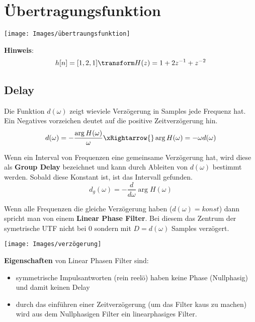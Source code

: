 \section{Übertragungsfunktion}
\begin{center}
	\texttt{[image: Images/übertraungsfunktion]}
\end{center}

\textbf{Hinweis}:
\[
h[n] = [1, 2, 1] \transform H(z) = 1 + 2z^{-1} + z^{-2}
\]

\subsection{Delay}
Die Funktion $d(\omega)$ zeigt wieviele Verzögerung in Samples jede Frequenz hat. Ein Negatives vorzeichen deutet auf die positive Zeitverzögerung hin.
\[
d(\omega) = -\frac{\arg H(\omega)}{\omega} \xRightarrow{} \arg H(\omega) = -\omega d(\omega)
\]

Wenn ein Interval von Frequenzen eine gemeinsame Verzögerung hat, wird diese als \textbf{Group Delay} bezeichnet und kann durch Ableiten von $d(\omega)$ bestimmt werden. Sobald diese Konstant ist, ist das Intervall gefunden.
\[
d_g(\omega) = - \frac{d}{d\omega}\arg H(\omega)
\]

Wenn alle Frequenzen die gleiche Verzögerung haben ($d(\omega) = konst$) dann spricht man von einem \textbf{Linear Phase Filter}. Bei diesem das Zentrum der symetrische UTF nicht bei 0 sondern mit $D = d(\omega)$ Samples verzögert.
\begin{center}
	\texttt{[image: Images/verzögerung]}
\end{center}

\textbf{Eigenschaften} von Linear Phasen Filter sind:
\begin{itemize}
	\item symmetrische Impulsantworten (rein reelö) haben keine Phase (Nullphasig) und damit keinen Delay
	\item durch das einführen einer Zeitverzögerung (um das Filter kaus zu machen) wird aus dem Nullphasigen Filter ein linearphasiges Filter.
\end{itemize}